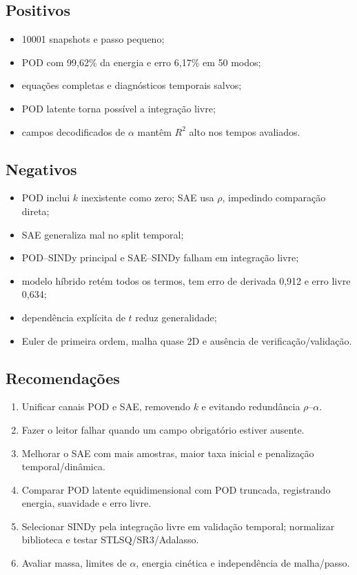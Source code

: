 \documentclass[12pt,a4paper]{article}
\begin{document}
\subsection*{Positivos}
\begin{itemize}
\item 10001 snapshots e passo pequeno;
\item POD com 99,62\% da energia e erro 6,17\% em 50 modos;
\item equações completas e diagnósticos temporais salvos;
\item POD latente torna possível a integração livre;
\item campos decodificados de $\alpha$ mantêm $R^2$ alto nos tempos avaliados.
\end{itemize}
\subsection*{Negativos}
\begin{itemize}
\item POD inclui $k$ inexistente como zero; SAE usa $\rho$, impedindo comparação direta;
\item SAE generaliza mal no split temporal;
\item POD--SINDy principal e SAE--SINDy falham em integração livre;
\item modelo híbrido retém todos os termos, tem erro de derivada 0,912 e erro livre 0,634;
\item dependência explícita de $t$ reduz generalidade;
\item Euler de primeira ordem, malha quase 2D e ausência de verificação/validação.
\end{itemize}
\subsection*{Recomendações}
\begin{enumerate}
\item Unificar canais POD e SAE, removendo $k$ e evitando redundância $\rho$--$\alpha$.
\item Fazer o leitor falhar quando um campo obrigatório estiver ausente.
\item Melhorar o SAE com mais amostras, maior taxa inicial e penalização temporal/dinâmica.
\item Comparar POD latente equidimensional com POD truncada, registrando energia, suavidade e erro livre.
\item Selecionar SINDy pela integração livre em validação temporal; normalizar biblioteca e testar STLSQ/SR3/Adalasso.
\item Avaliar massa, limites de $\alpha$, energia cinética e independência de malha/passo.
\end{enumerate}
\end{document}
